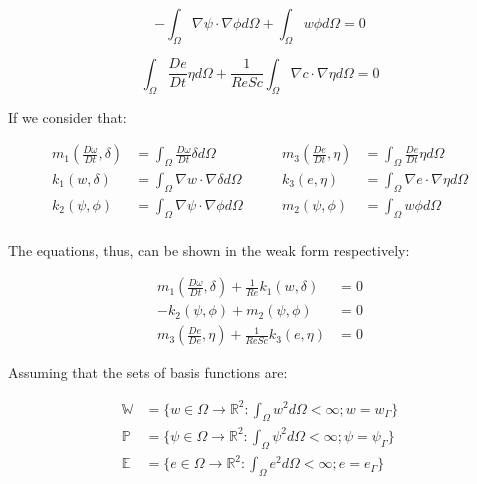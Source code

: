 \begin{equation} \label{diffusion_stream}
 - \int_{\Omega} \nabla \psi \cdot \nabla \phi d\Omega
 + \int_{\Omega} w \phi d\Omega = 0
\end{equation}

\begin{equation} \label{diffusion_concentration} 
   \int_{\Omega} \frac{D e}{Dt} \eta d\Omega
 + \frac{1}{\textit{ReSc}} \int_{\Omega} \nabla c \cdot \nabla \eta d\Omega 
 = 0
\end{equation}


\medskip
\noindent
If we consider that:

\begin{equation}
 \begin{aligned}
  \textbf{$m_1$}(\frac{D \omega}{Dt},\delta) & = \int_{\Omega} \frac{D \omega}{Dt} \delta d\Omega \\ 
  \textbf{$k_1$}(w,\delta) & = \int_{\Omega} \nabla w \cdot \nabla \delta d\Omega \\
  \textbf{$k_2$}(\psi,\phi) & = \int_{\Omega} \nabla \psi \cdot \nabla \phi d\Omega \\
 \end{aligned}
 \qquad
 \begin{aligned}  
  \textbf{$m_3$}(\frac{De}{Dt},\eta) & = \int_{\Omega} \frac{De}{Dt} \eta d\Omega \\
  \textbf{$k_3$}(e,\eta) & = \int_{\Omega} \nabla e \cdot \nabla \eta d\Omega \\
  \textbf{$m_2$}(\psi,\phi) & = \int_{\Omega} w \phi d\Omega \\
 \end{aligned}
\end{equation}

\noindent
The equations, thus, can be shown in the weak form respectively:

\begin{align}
 \textbf{$m_1$}(\frac{D \omega}{Dt},\delta) 
 + \frac{1}{\textit{Re}}\textbf{$k_1$}(w,\delta) 
 & = 0 \\
 - \textbf{$k_2$}(\psi,\phi) 
 + \textbf{$m_2$}(\psi,\phi) 
 & = 0 \\
 \textbf{$m_3$}(\frac{De}{De},\eta) 
 + \frac{1}{\textit{ReSc}}\textbf{$k_3$}(e,\eta) 
 & = 0
\end{align}


\noindent
Assuming that the sets of basis functions are:

\begin{equation}
 \begin{aligned}
  \mathbb{W} &= \{w \in \Omega \rightarrow \mathbb{R}^2
  : \int_\Omega w^2 d\Omega < \infty 
  ; w = w_\Gamma\} \\
  \mathbb{P} &= \{\psi \in \Omega \rightarrow \mathbb{R}^2
  : \int_\Omega \psi^2 d\Omega < \infty 
  ; \psi = \psi_\Gamma\} \\
  \mathbb{E} &= \{e \in \Omega \rightarrow \mathbb{R}^2
  : \int_\Omega e^2 d\Omega < \infty 
  ; e = e_\Gamma\}
 \end{aligned}
\end{equation}

